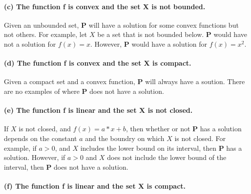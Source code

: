 \documentclass[11pt]{article}
\def\gt{>}
\begin{document}
\hypertarget{c-the-function-f-is-convex-and-the-set-x-is-not-bounded.}{%
\paragraph{(c) The function f is convex and the set X is not
bounded.}\label{c-the-function-f-is-convex-and-the-set-x-is-not-bounded.}}

Given an unbounded set, \(\mathbf{P}\) will have a solution for some
convex functions but not others. For example, let \(X\) be a set that is
not bounded below. \(\mathbf{P}\) would have not a solution for
\(f(x) = x\). However, \(\mathbf{P}\) would have a solution for
\(f(x) = x^2\).

\hypertarget{d-the-function-f-is-convex-and-the-set-x-is-compact.}{%
\paragraph{(d) The function f is convex and the set X is
compact.}\label{d-the-function-f-is-convex-and-the-set-x-is-compact.}}

Given a compact set and a convex function, \(\mathbf{P}\) will always
have a soution. There are no examples of where \(\mathbf{P}\) does not
have a solution.

\hypertarget{e-the-function-f-is-linear-and-the-set-x-is-not-closed.}{%
\paragraph{(e) The function f is linear and the set X is not
closed.}\label{e-the-function-f-is-linear-and-the-set-x-is-not-closed.}}

If \(X\) is not closed, and \(f(x) = a*x + b\), then whether or not
\(\mathbf{P}\) has a solution depends on the constant \(a\) and the
boundry on which \(X\) is not closed. For example, if \(a \gt 0\), and
\(X\) includes the lower bound on its interval, then \(\mathbf{P}\) has
a solution. However, if \(a \gt 0\) and \(X\) does not include the lower
bound of the interval, then \(\mathbf{P}\) does not have a solution.

\hypertarget{f-the-function-f-is-linear-and-the-set-x-is-compact.}{%
\paragraph{(f) The function f is linear and the set X is
compact.}\label{f-the-function-f-is-linear-and-the-set-x-is-compact.}}
\end{document}
